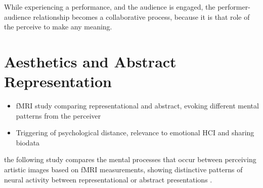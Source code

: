 While experiencing a performance, and the audience is engaged, the performer-audience relationship becomes a collaborative process, because it is that role of the perceive to make any meaning.

\section{Aesthetics and Abstract Representation}
\label{lit_review:abstract}

\begin{itemize}
\item fMRI study comparing representational and abstract, evoking different mental patterns from the perceiver
\item Triggering of psychological distance, relevance to emotional HCI and sharing biodata
\end{itemize}

the following study compares the mental processes that occur between perceiving artistic images based on fMRI measurements, showing distinctive patterns of neural activity between representational or abstract presentations \cite{}.





